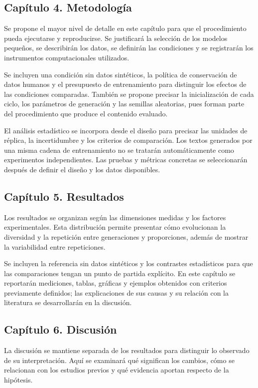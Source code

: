 \documentclass[12pt,letterpaper]{article}
\begin{document}
\subsection*{Capítulo 4. Metodología}
Se propone el mayor nivel de detalle en este capítulo para que el
procedimiento pueda ejecutarse y reproducirse. Se justificará la selección
de los modelos pequeños, se describirán los datos, se definirán las
condiciones y se registrarán los instrumentos computacionales utilizados.

Se incluyen una condición sin datos sintéticos, la política de conservación
de datos humanos y el presupuesto de entrenamiento para distinguir los
efectos de las condiciones comparadas. También se propone precisar la
inicialización de cada ciclo, los parámetros de generación y las semillas
aleatorias, pues forman parte del procedimiento que produce el contenido
evaluado.

El análisis estadístico se incorpora desde el diseño para precisar las
unidades de réplica, la incertidumbre y los criterios de comparación.
Los textos generados por una misma cadena de entrenamiento no se tratarán
automáticamente como experimentos independientes. Las pruebas y métricas
concretas se seleccionarán después de definir el diseño y los datos
disponibles.

\subsection*{Capítulo 5. Resultados}
Los resultados se organizan según las dimensiones medidas y los factores
experimentales. Esta distribución permite presentar cómo evolucionan la
diversidad y la repetición entre generaciones y proporciones, además de
mostrar la variabilidad entre repeticiones.

Se incluyen la referencia sin datos sintéticos y los contrastes estadísticos
para que las comparaciones tengan un punto de partida explícito. En este
capítulo se reportarán mediciones, tablas, gráficas y ejemplos obtenidos con
criterios previamente definidos; las explicaciones de sus causas y su
relación con la literatura se desarrollarán en la discusión.

\subsection*{Capítulo 6. Discusión}
La discusión se mantiene separada de los resultados para distinguir lo
observado de su interpretación. Aquí se examinará qué significan los cambios,
cómo se relacionan con los estudios previos y qué evidencia aportan respecto
de la hipótesis.
\end{document}
